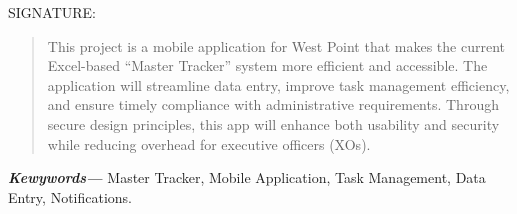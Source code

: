 \documentclass [11pt]{article}
\providecommand{\keywords}[1]
{
  \small	
  \textbf{\textit{Kewywords---}} #1
}
\begin{document}
\begin{titlepage}
\noindent
SIGNATURE: \textunderscore \textunderscore \textunderscore \textunderscore\textunderscore \textunderscore \textunderscore \textunderscore\textunderscore \textunderscore \textunderscore \textunderscore\textunderscore \textunderscore \textunderscore \textunderscore\textunderscore \textunderscore \textunderscore \textunderscore\textunderscore \textunderscore \textunderscore \textunderscore\textunderscore \textunderscore \textunderscore \textunderscore\textunderscore \textunderscore \textunderscore \textunderscore\textunderscore \textunderscore \textunderscore \textunderscore\textunderscore \textunderscore \textunderscore \textunderscore\textunderscore \textunderscore \textunderscore \textunderscore\textunderscore \textunderscore \textunderscore \textunderscore\textunderscore \textunderscore \textunderscore \textunderscore\textunderscore \textunderscore \textunderscore \textunderscore\textunderscore \textunderscore \textunderscore \textunderscore\textunderscore \textunderscore \textunderscore \textunderscore\textunderscore \textunderscore \textunderscore \textunderscore\textunderscore \textunderscore \textunderscore \textunderscore\textunderscore \textunderscore \textunderscore \textunderscore\textunderscore  
\end{titlepage}


\maketitle
\tableofcontents
\newpage
\thispagestyle{firstpage}

\begin{abstract}
  This project is a mobile application for West Point that makes the current Excel-based “Master Tracker” system more efficient and accessible. The application will streamline data entry, improve task management efficiency, and ensure timely compliance with administrative requirements. Through secure design principles, this app will enhance both usability and security while reducing overhead for executive officers (XOs). 
\end{abstract}\hspace{10pt}

\keywords{Master Tracker, Mobile Application, Task Management, Data Entry, Notifications. }
\end{document}
